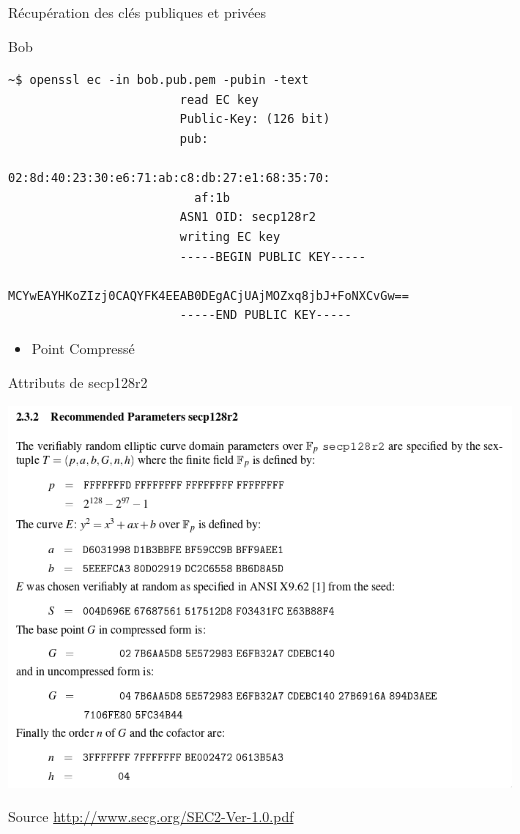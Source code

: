 \documentclass[10pt,sans,usenames,dvipsnames,french,compress]{beamer}
\begin{document}
\begin{frame}[fragile]{Récupération des clés publiques et privées}
  \begin{block}{Bob}
    \vspace{-3mm}
    \begin{lstlisting}[style=Term]
                        ~$ openssl ec -in bob.pub.pem -pubin -text
                        read EC key
                        Public-Key: (126 bit)
                        pub:
                          02:8d:40:23:30:e6:71:ab:c8:db:27:e1:68:35:70:
                          af:1b
                        ASN1 OID: secp128r2
                        writing EC key
                        -----BEGIN PUBLIC KEY-----
                        MCYwEAYHKoZIzj0CAQYFK4EEAB0DEgACjUAjMOZxq8jbJ+FoNXCvGw==
                        -----END PUBLIC KEY-----
    \end{lstlisting}
    \vspace{-2mm}
  \end{block}

	\begin{itemize}
    \item <2->Point Compressé
  \end{itemize}

\end{frame}



\begin{frame}[fragile]{Attributs de secp128r2}
	\begin{center}
		\includegraphics[width=0.7\linewidth]{120/secp128r2.png}
	\end{center}
  \begin{block}{Source}
    \url{http://www.secg.org/SEC2-Ver-1.0.pdf}
  \end{block}
\end{frame}
\end{document}
